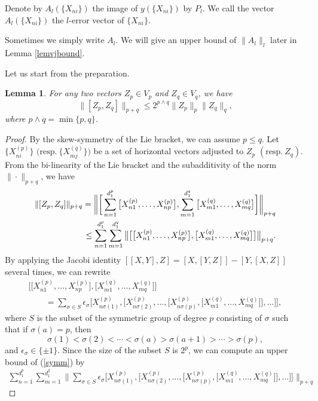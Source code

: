 \documentclass[pdftex]{sigma}
\numberwithin{equation}{section}
\newtheorem{Lemma}[Theorem]{Lemma}
\begin{document}
\begin{Definition}
 Denote by $A_l(\{X_{ni}\})$ the image of $y(\{X_{ni}\})$ by $P_l$.
 We call the vec\-tor~$A_l(\{X_{ni}\})$ the $l$-error vector of $\{X_{ni}\}$.
\end{Definition}
Sometimes we simply write $A_l$.
We will give an upper bound of $\|A_l\|_l$ later in Lemma \ref{lemvjbound}.

Let us start from the preparation.
\begin{Lemma}\label{lemsubmulti}
 For any two vectors $Z_p\in V_p$ and $Z_q\in V_q$,
 we have
 \[\|[Z_p,Z_q]\|_{p+q}\leq 2^{p\wedge q}\|Z_p\|_p\|Z_q\|_q,\]
 where $p\wedge q=\min\{p,q\}$.
\end{Lemma}

\begin{proof}
 {\sloppy By the skew-symmetry of the Lie bracket,
 we can assume $p\leq q$.
 Let $\bigl\{X_{ni}^{(p)}\bigr\}$ $\bigl(\text{resp.}~\bigl\{X_{mj}^{(q)}\bigr\}\bigr)$ be a set of horizontal vectors adjusted to $Z_p$ $(\text{resp.}~Z_q)$.
From the bi-linearity of the Lie bracket and the subadditivity of the norm $\|\cdot\|_{p+q}$,
we have
\begin{align}
 \|[Z_p,Z_q]\|_{p+q}=\bigg\|\bigg[\sum_{n=1}^{d_1^p}\big[X_{n1}^{(p)},\dots,X_{np}^{(p)}\big], \sum_{m=1}^{d_1^q}\big[X_{m1}^{(q)},\dots,X_{mq}^{(q)}\big]\bigg]\bigg\|_{p+q} \notag \\
 \leq\sum_{n=1}^{d_1^p}\sum_{m=1}^{d_1^q}\big\|\big[\big[X_{n1}^{(p)},\dots,X_{np}^{(p)}\big], \big[X_{m1}^{(q)},\dots,X_{mq}^{(q)}\big]\big]\big\|_{p+q}.\label{symm}
\end{align}}\noindent
By applying the Jacobi identity $[[X,Y],Z]=[X,[Y,Z]]-[Y,[X,Z]]$ several times,
we can rewrite
\begin{gather*}
\bigl[\big[X_{n1}^{(p)},\dots,X_{np}^{(p)}\big],\big[X_{m1}^{(q)},\dots,X_{mq}^{(q)}\big]\bigr]
 \\ \qquad
{} =\sum_{\sigma\in S}\epsilon_{\sigma}\big[X_{n\sigma(1)}^{(p)},\big[X_{n\sigma(2)}^{(p)},\dots, \big[X_{n\sigma(p)}^{(p)},\big[X_{m1}^{(q)},\dots,X_{mq}^{(q)}\big]\big],\ldots\big]\big],
\end{gather*}
where $S$ is the subset of the symmetric group of degree $p$ consisting of $\sigma$ such that if $\sigma(a)=p$,
then
\[
\sigma(1)<\sigma(2)<\cdots<\sigma(a)>\sigma(a+1)>\cdots>\sigma(p),
\]
and $\epsilon_{\sigma}\in\{\pm1\}$.
Since the size of the subset $S$ is $2^p$,
we can compute an upper bound of (\ref{symm}) by
\begin{gather*}
 \sum_{n=1}^{d_1^p}\sum_{m=1}^{d_1^q}\bigg\|\sum_{\sigma\in S}\epsilon_{\sigma}\big[X_{n\sigma(1)}^{(p)},\big[X_{n\sigma(2)}^{(p)},\dots,\big[X_{n\sigma(p)}^{(p)}, \big[X_{m1}^{(q)},\dots,X_{mq}^{(q)}\big]\big],\ldots\big]\big]\bigg\|_{p+q}

\end{gather*}
\end{proof}
\end{document}
